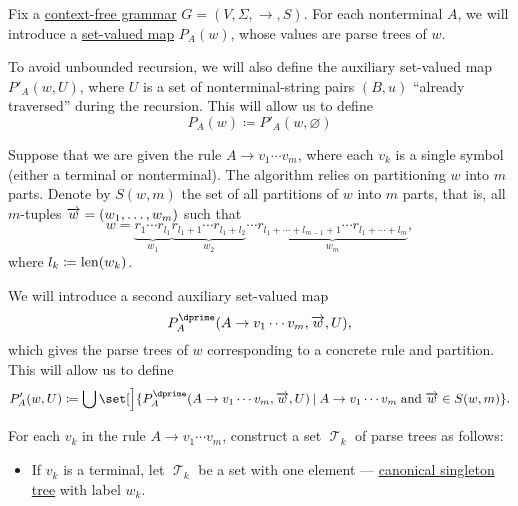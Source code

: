 \begin{algorithm}\label{alg:brute_force_parsing}
  Fix a \hyperref[def:chomsky_hierarchy/context_free]{context-free grammar} \( G = (V, \Sigma, \to, S) \). For each nonterminal \( A \), we will introduce a \hyperref[def:function]{set-valued map} \( P_A(w) \), whose values are parse trees of \( w \).

  To avoid unbounded recursion, we will also define the auxiliary set-valued map \( P'_A(w, U) \), where \( U \) is a set of nonterminal-string pairs \( (B, u) \) \enquote{already traversed} during the recursion. This will allow us to define
  \begin{equation*}
    P_A(w)
    \coloneqq
    P'_A(w, \varnothing)
  \end{equation*}

  Suppose that we are given the rule \( A \to v_1 \cdots v_m \), where each \( v_k \) is a single symbol (either a terminal or nonterminal). The algorithm relies on partitioning \( w \) into \( m \) parts. Denote by \( S(w, m) \) the set of all partitions of \( w \) into \( m \) parts, that is, all \( m \)-tuples \( \overrightarrow{w} = (w_1, \ldots, w_m) \) such that
  \begin{equation*}
    w = \underbrace{ r_1 \cdots r_{l_1} }_{w_1} \underbrace{ r_{l_1 + 1} \cdots r_{l_1 + l_2} }_{w_2} \cdots \underbrace{ r_{l_1 + \cdots + l_{m-1} + 1} \cdots r_{l_1 + \cdots + l_m} }_{w_m},
  \end{equation*}
  where \( l_k \coloneqq \operatorname{len}(w_k) \).

  We will introduce a second auxiliary set-valued map
  \begin{equation*}
    P^\dprime_A(A \to v_1 \cdots v_m, \vect w, U),
  \end{equation*}
  which gives the parse trees of \( w \) corresponding to a concrete rule and partition. This will allow us to define
  \begin{equation*}
    P'_A(w, U)
    \coloneqq
    \bigcup\set[\Big]{ P^\dprime_A(A \to v_1 \cdots v_m, \vect w, U) \given A \to v_1 \cdots v_m \T{and} \vect w \in S(w, m) }.
  \end{equation*}

  \begin{thmenum}
     For each \( v_k \) in the rule \( A \to v_1 \cdots v_m \), construct a set \( \mscrT_k \) of parse trees as follows:
    \begin{itemize}
      \item If \( v_k \) is a terminal, let \( \mscrT_k \) be a set with one element --- \hyperref[def:canonical_singleton_tree]{canonical singleton tree} with label \( w_k \).


\end{itemize}
\end{thmenum}
\end{algorithm}
